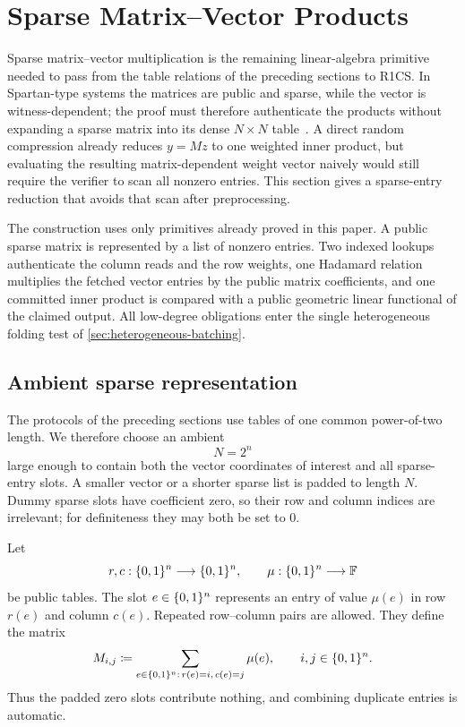 \section{Sparse Matrix--Vector Products}
\label{sec:sparse-matvec}

Sparse matrix--vector multiplication is the remaining linear-algebra primitive needed to pass from the table relations of the preceding sections to R1CS.  In Spartan-type systems the matrices are public and sparse, while the vector is witness-dependent; the proof must therefore authenticate the products without expanding a sparse matrix into its dense $N\times N$ table~\cite{Setty20}.  A direct random compression already reduces $y=Mz$ to one weighted inner product, but evaluating the resulting matrix-dependent weight vector naively would still require the verifier to scan all nonzero entries.  This section gives a sparse-entry reduction that avoids that scan after preprocessing.

The construction uses only primitives already proved in this paper.  A public sparse matrix is represented by a list of nonzero entries.  Two indexed lookups authenticate the column reads and the row weights, one Hadamard relation multiplies the fetched vector entries by the public matrix coefficients, and one committed inner product is compared with a public geometric linear functional of the claimed output.  All low-degree obligations enter the single heterogeneous folding test of \cref{sec:heterogeneous-batching}.

\subsection{Ambient sparse representation}
\label{sec:sparse-representation}

The protocols of the preceding sections use tables of one common power-of-two length.  We therefore choose an ambient
\begin{equation}
  N=2^n
  \label{eq:sparse-ambient-N}
\end{equation}
large enough to contain both the vector coordinates of interest and all sparse-entry slots.  A smaller vector or a shorter sparse list is padded to length $N$.  Dummy sparse slots have coefficient zero, so their row and column indices are irrelevant; for definiteness they may both be set to $0$.

Let
\begin{equation}
  r,c:\{0,1\}^n\longrightarrow\{0,1\}^n,
  \qquad
  \mu:\{0,1\}^n\longrightarrow\mathbb{F}
  \label{eq:sparse-entry-tables}
\end{equation}
be public tables.  The slot $e\in\{0,1\}^n$ represents an entry of value $\mu(e)$ in row $r(e)$ and column $c(e)$.  Repeated row--column pairs are allowed.  They define the matrix
\begin{equation}
  M_{i,j}
  \coloneqq
  \sum_{e\in\{0,1\}^n:\,r(e)=i,\,c(e)=j}\mu(e),
  \qquad i,j\in\{0,1\}^n.
  \label{eq:sparse-matrix-definition}
\end{equation}
Thus the padded zero slots contribute nothing, and combining duplicate entries is automatic.

